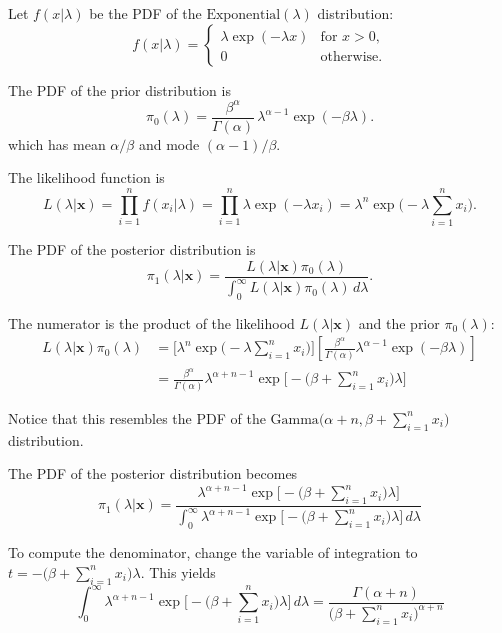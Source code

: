 \begin{solution}
Let $f(x|\lambda)$ be the PDF of the $\text{Exponential}(\lambda)$ distribution:
\[
f(x|\lambda) = \left\{\begin{array}{ll}
	\lambda\exp(-\lambda x) & \text{for $x>0$}, \\
	0							& \text{otherwise.}
\end{array}\right.
\]

The PDF of the prior distribution is
\[
\pi_0(\lambda) = 	\frac{\beta^{\alpha}}{\Gamma(\alpha)}\,\lambda^{\alpha-1}\exp(-\beta\lambda).
\]
which has mean $\alpha/\beta$ and mode $(\alpha-1)/\beta$.


The likelihood function is
\[
L(\lambda|\mathbf{x}) 
	= \prod_{i=1}^n f(x_i|\lambda)
	= \prod_{i=1}^n \lambda\exp(-\lambda x_i)
	= \lambda^n \exp\Big(-\lambda\textstyle\sum_{i=1}^n  x_i\Big).
\]

The PDF of the posterior distribution is
\[
\pi_1(\lambda|\mathbf{x})	
	= \frac{L(\lambda|\mathbf{x})\pi_0(\lambda)}{\displaystyle\int_0^{\infty} L(\lambda|\mathbf{x})\pi_0(\lambda)\,d\lambda}.
\]

The numerator is the product of the likelihood $L(\lambda|\mathbf{x})$ and the prior $\pi_0(\lambda)$:
\begin{align*}
L(\lambda|\mathbf{x})\pi_0(\lambda)
	& = \Big[\lambda^n \exp\big(-\lambda\textstyle\sum_{i=1}^n  x_i\big)\Big]\left[\displaystyle\frac{\beta^{\alpha}}{\Gamma(\alpha)}\lambda^{\alpha-1}\exp(-\beta\lambda)\right] \\[1ex]
	& = \frac{\beta^{\alpha}}{\Gamma(\alpha)} \lambda^{\alpha+n-1}\exp\Big[-\big(\beta+\textstyle\sum_{i=1}^n x_i\big)\lambda\Big]
\end{align*}

Notice that this resembles the PDF of the $\text{Gamma}\Big(\alpha+n,\beta+\sum_{i=1}^n x_i\Big)$ distribution.


The PDF of the posterior distribution becomes
\[
\pi_1(\lambda|\mathbf{x})	
	= \frac{\lambda^{\alpha+n-1}\exp\Big[-\big(\beta+\sum_{i=1}^n x_i\big)\lambda\Big]}
		{\displaystyle\int_0^{\infty} \lambda^{\alpha+n-1}\exp\Big[-\big(\beta+\sum_{i=1}^n x_i\big)\lambda\Big]\,d\lambda}
\]

To compute the denominator, change the variable of integration to $t = -\big(\beta+\sum_{i=1}^n x_i\big)\lambda$. This yields
\[
\int_0^{\infty} \lambda^{\alpha+n-1}\exp\Big[-\big(\beta+\textstyle\sum_{i=1}^n x_i\big)\lambda\Big]\,d\lambda 
	= \displaystyle\frac{\Gamma(\alpha+n)}{\big(\beta+\sum_{i=1}^n x_i\big)^{\alpha+n}}
\]


\end{solution}
